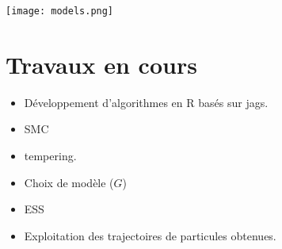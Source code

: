 \documentclass{beamer}
\newcommand{\fr}[1]{#1}
\newcommand{\en}[1]{}
\begin{document}
\begin{frame}[plain]


\texttt{[image: models.png]}
\end{frame}

\section{\en{Work in progress}\fr{Travaux en cours}}
\begin{frame}
\begin{itemize}
\item Développement d'algorithmes en R basés sur jags.
\item SMC
\item tempering.
\item \fr{Choix de modèle}\en{Model choice} ($G$)
\item ESS
\item Exploitation des trajectoires de particules obtenues.
\end{itemize}
\end{frame}




\begin{frame}[allowframebreaks]

\nocite{*}
 

 

\end{frame} 
\end{document}

